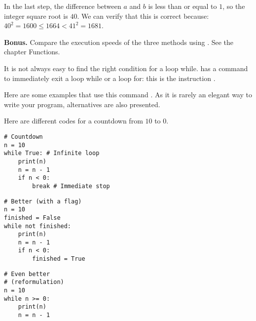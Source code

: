 \documentclass[11pt,class=report,crop=false]{standalone}
\begin{document}
\begin{activite}
\begin{enumerate}
\medskip

In the last step, the difference between $a$ and $b$ is less than or equal to $1$, so the integer square root is $40$. We can verify that this is correct because: $40^2 = 1600 \le 1664 < 41^2 = 1681$.
    
\end{enumerate}  
  
  
\textbf{Bonus.} Compare the execution speeds of the three methods using . See the chapter \og{}Functions\fg{}.

\end{activite}



\begin{cours}

It is not always easy to find the right condition for a loop \og{}while\fg{}. \Python{} has a command to immediately exit a loop \og{}while\fg{}
or a loop \og{}for\fg{}: this is the instruction 
.

Here are some examples that use this command . As it is rarely an elegant way to write your program, alternatives are also presented.

\begin{exemple}

Here are different codes for a countdown from $10$ to $0$.

\begin{minipage}{0.35\textwidth}
\begin{lstlisting}
# Countdown
n = 10
while True: # Infinite loop
    print(n)
    n = n - 1
    if n < 0:
        break # Immediate stop
\end{lstlisting}
\end{minipage}\qquad\qquad
\begin{minipage}{0.35\textwidth}
\begin{lstlisting}
# Better (with a flag)
n = 10
finished = False
while not finished:
    print(n)
    n = n - 1   
    if n < 0:
        finished = True
\end{lstlisting}
\end{minipage}
\begin{minipage}{0.2\textwidth}
\begin{lstlisting}
# Even better 
# (reformulation)
n = 10
while n >= 0:
    print(n)
    n = n - 1
\end{lstlisting}
\end{minipage}
\end{exemple}


\end{cours}
\end{document}
